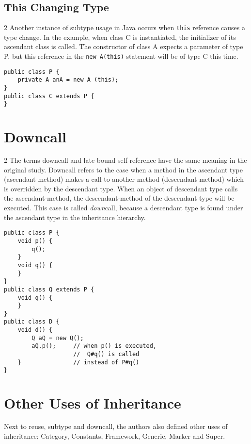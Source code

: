 \documentclass{uvamscse}
\begin{document}
\subsection{This Changing Type}
\begin{multicols} {2}
Another instance of subtype usage in Java occurs when \texttt{this} reference causes a type change. In the example, when class C is instantiated, the initializer of its ascendant class is called. The constructor of class A expects a parameter of type P, but this reference in the \texttt{new A(this)} statement will be of type C this time.

\columnbreak
\begin{verbatim}
public class P {
    private A anA = new A (this);
}
public class C extends P {
}
\end{verbatim}
\end{multicols}

\section{Downcall}
\begin{multicols} {2}
The terms downcall and late-bound self-reference have the same meaning in the original study. Downcall refers to the case when a method in the ascendant type (ascendant-method) makes a call to another method (descendant-method) which is overridden by the descendant type. When an object of descendant type calls the ascendant-method, the descendant-method of the descendant type will be executed. This case is called \textit{down}call, because a descendant type is found under the ascendant type in the inheritance hierarchy.
\columnbreak
\begin{verbatim}
public class P {
    void p() {
        q();
    }
    void q() {
    }
}
public class Q extends P {
    void q() {
    }
}
public class D {
    void d() {
        Q aQ = new Q();
        aQ.p();     // when p() is executed,
                    //  Q#q() is called
    }               // instead of P#q()
}
\end{verbatim}
\end{multicols}

\section{Other Uses of Inheritance}
Next to reuse, subtype and downcall, the authors also defined other uses of inheritance: Category, Constants, Framework, Generic, Marker and Super.
\end{document}

